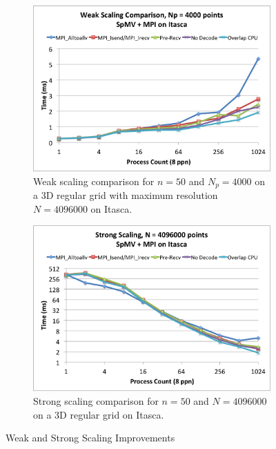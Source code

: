 \documentclass{report}
\begin{document}
\begin{figure}
\centering
\begin{subfigure}[t]{0.48\textwidth}
\centering
\includegraphics[width=\textwidth]{performance_content/scaling/weak_scaling_np4000_compare_SpMV_and_comm_n50.png}
\caption{Weak scaling comparison for $n=50$ and $N_p = 4000$ on a 3D regular grid with maximum resolution $N=4096000$ on Itasca.}
\label{fig:compare_weak_scaling_n50}
\end{subfigure}
\quad
\begin{subfigure}[t]{0.48\textwidth}
\centering
\includegraphics[width=\textwidth]{performance_content/scaling/strong_scaling_4M_compare_SpMV_and_comm_n50.png}
\caption{Strong scaling comparison for $n=50$ and $N = 4096000$ on a 3D regular grid on Itasca.}
\label{fig:compare_strong_scaling_n50}
\end{subfigure}
\caption{Weak and Strong Scaling Improvements}
\end{figure}
\end{document}
